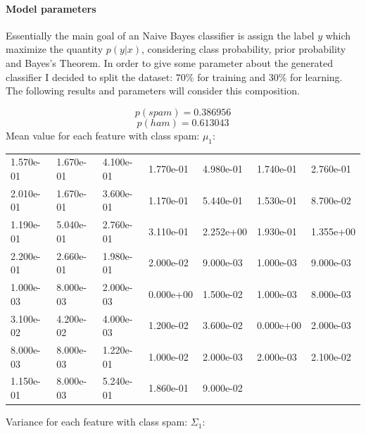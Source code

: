 \documentclass[11pt,a4paper]{article}
\begin{document}
\paragraph{Model parameters}Essentially the main goal of an Naive Bayes classifier is assign the label $y$ which maximize the quantity $p(y|x)$, considering class probability, prior probability and Bayes's Theorem. In order to give some parameter about the generated classifier I decided to split the dataset: $70\%$ for training and $30\%$ for learning. The following results and parameters will consider this composition.

$$
p(spam) = 0.386956
$$
$$ 
p(ham) = 0.613043
$$
\newline
Mean value for each feature with class spam: $\mu_1$:
\begin{table}[!htbp]
	\begin{tabularx}{\linewidth}{|l|l|l|l|l|l|l|}
	\cline{1-7}
	\centering 1.570e-01 & 1.670e-01 & 4.100e-01 & 1.770e-01 & 4.980e-01 & 1.740e-01 & 2.760e-01\\
	\cline{1-7}
	\centering 2.010e-01 & 1.670e-01 & 3.600e-01 & 1.170e-01 & 5.440e-01 & 1.530e-01 & 8.700e-02\\
	\cline{1-7}
	\centering 1.190e-01 & 5.040e-01 & 2.760e-01 & 3.110e-01 & 2.252e+00 & 1.930e-01 & 1.355e+00\\
	\cline{1-7}
	\centering 2.200e-01 & 2.660e-01 & 1.980e-01 & 2.000e-02 & 9.000e-03 & 1.000e-03 & 9.000e-03\\
	\cline{1-7}
	\centering 1.000e-03 & 8.000e-03 & 2.000e-03 & 0.000e+00 & 1.500e-02 & 1.000e-03 & 8.000e-03\\
	\cline{1-7}
	\centering 3.100e-02 & 4.200e-02 & 4.000e-03 & 1.200e-02 & 3.600e-02 & 0.000e+00 & 2.000e-03\\
	\cline{1-7}
	\centering 8.000e-03 & 8.000e-03 & 1.220e-01 & 1.000e-02 & 2.000e-03 & 2.000e-03 & 2.100e-02\\
	\cline{1-7}
	\centering 1.150e-01 & 8.000e-03 & 5.240e-01 & 1.860e-01 & 9.000e-02 & & \\
	\cline{1-7}
		
	\end{tabularx}
\end{table}

\newpage

Variance for each feature with class spam: $\Sigma_1$:
\end{document}
